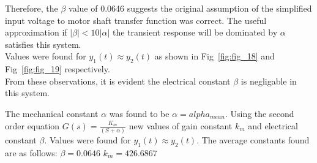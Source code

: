 \documentclass[11pt,a4paper]{article}
\begin{document}
\begin{enumerate}
	Therefore, the $\beta$ value of 0.0646 suggests the original assumption of the simplified input voltage to motor shaft transfer function was correct. The useful approximation if $|\beta| < 10|\alpha|$ the transient response will be dominated by $\alpha$ satisfies this system.\\
	Values were found for $y_1(t) \approx y_2(t)$ as shown in Fig~\ref{fig:fig_18} and Fig~\ref{fig:fig_19} respectively.\\
	From these observations, it is evident the electrical constant $\beta$ is negligable in this system. 


	The mechanical constant $\alpha$ was found to be $\alpha = alpha_{mean}$. Using the second order equation $G(s) = \frac{K_m}{(S + \alpha)}$ new values of gain constant $k_m$ and electrical constant $\beta$. Values were found for $y_1(t) \approx y_2(t)$.
    The average constants found are as follows:
    $\beta = 0.0646$
    $k_m = 426.6867$
    
   \begin{figure}[H]
	

\end{figure}
\end{enumerate}
\end{document}
